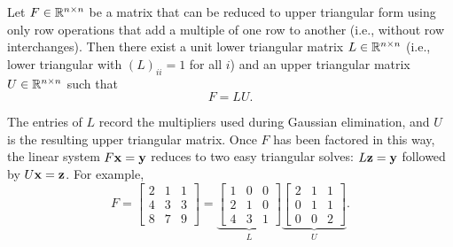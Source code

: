 \begin{definition}[LU decomposition]
    Let $F \in \mathbb{R}^{n \times n}$ be a matrix that can be reduced to upper triangular form using only row operations that add a multiple of one row to another (i.e., without row interchanges). Then there exist a unit lower triangular matrix $L \in \mathbb{R}^{n \times n}$ (i.e., lower triangular with $(L)_{ii}=1$ for all $i$) and an upper triangular matrix $U \in \mathbb{R}^{n \times n}$ such that
    \begin{equation*}
        F = LU.
    \end{equation*}
\end{definition}
The entries of $L$ record the multipliers used during Gaussian elimination, and $U$ is the resulting upper triangular matrix. Once $F$ has been factored in this way, the linear system $F\mathbf{x} = \mathbf{y}$ reduces to two easy triangular solves: $L\mathbf{z} = \mathbf{y}$ followed by $U\mathbf{x} = \mathbf{z}$. For example,
\begin{equation*}
    F = \begin{bmatrix}
        2 & 1 & 1 \\
        4 & 3 & 3 \\
        8 & 7 & 9
    \end{bmatrix}
    =
    \underbrace{\begin{bmatrix}
        1 & 0 & 0 \\
        2 & 1 & 0 \\
        4 & 3 & 1
    \end{bmatrix}}_{L}
    \underbrace{\begin{bmatrix}
        2 & 1 & 1 \\
        0 & 1 & 1 \\
        0 & 0 & 2
    \end{bmatrix}}_{U}.
\end{equation*}

